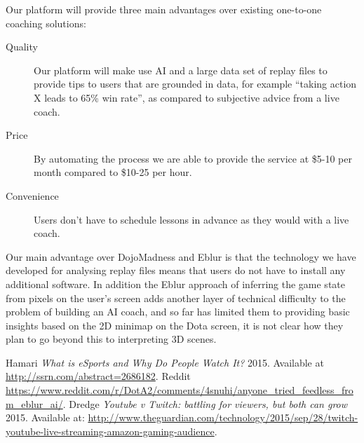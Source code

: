 \documentclass[12pt]{article} %
\begin{document}
Our platform will provide three main advantages over existing one-to-one coaching solutions: 

\begin{description}
    \item [Quality] Our platform will make use AI and a large data set of replay files to provide tips to users that are grounded in data, for example ``taking action X leads to 65\% win rate'', as compared to subjective advice from a live coach.
    \item [Price] By automating the process we are able to provide the service at \$5-10 per month compared to \$10-25 per hour.
    \item [Convenience] Users don't have to schedule lessons in advance as they would with a live coach.
\end{description}


Our main advantage over DojoMadness and Eblur is that the technology we have developed for analysing replay files means that users do not have to install any additional software. In addition the Eblur approach of inferring the game state from pixels on the user's screen adds another layer of technical difficulty to the problem of building an AI coach, and so far has limited them to providing basic insights based on the 2D minimap on the Dota screen, it is not clear how they plan to go beyond this to interpreting 3D scenes. 

\begin{thebibliography}{10}

  Hamari  {\em What is eSports and Why Do People Watch It?} 2015. Available at \url{http://ssrn.com/abstract=2686182}.
 Reddit \url{https://www.reddit.com/r/DotA2/comments/4snuhi/anyone_tried_feedless_from_eblur_ai/}.
 Dredge  {\em Youtube v Twitch: battling for viewers, but both can grow}  2015. Available at: \url{http://www.theguardian.com/technology/2015/sep/28/twitch-youtube-live-streaming-amazon-gaming-audience}.

\end{thebibliography}
\end{document}

